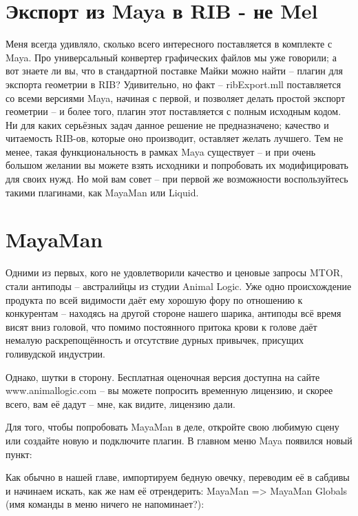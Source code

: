 \section*{Экспорт из Maya в RIB - не Mel}
  

 Меня всегда удивляло, сколько всего интересного
    поставляется в комплекте с Maya. Про универсальный конвертер
    графических файлов мы уже говорили; а вот знаете ли вы, что в
    стандартной поставке Майки можно найти – плагин для экспорта
    геометрии в RIB? Удивительно, но факт – ribExport.mll поставляется
    со всеми версиями Maya, начиная с первой, и позволяет делать
    простой экспорт геометрии – и более того, плагин этот поставляется
    с полным исходным кодом. Ни для каких серьёзных задач данное
    решение не предназначено; качество и читаемость RIB-ов, которые оно
    производит, оставляет желать лучшего. Тем не менее, такая
    функциональность в рамках Maya существует – и при очень большом
    желании вы можете взять исходники и попробовать их модифицировать
    для своих нужд. Но мой вам совет – при первой же возможности
    воспользуйтесь такими плагинами, как MayaMan или Liquid.
  
\section*{MayaMan}
  

 Одними из первых, кого не удовлетворили качество и
    ценовые запросы MTOR, стали антиподы – австралийцы из студии Animal
    Logic. Уже одно происхождение продукта по всей видимости даёт ему
    хорошую фору по отношению к конкурентам – находясь на другой
    стороне нашего шарика, антиподы всё время висят вниз головой, что
    помимо постоянного притока крови к голове даёт немалую
    раскрепощённость и отсутствие дурных привычек, присущих голивудской
    индустрии.
  

 Однако, шутки в сторону. Бесплатная оценочная
    версия доступна на сайте www.animallogic.com – вы можете
    попросить временную лицензию, и скорее всего, вам её дадут – мне,
    как видите, лицензию дали.
  

 Для того, чтобы попробовать MayaMan в деле,
    откройте свою любимую сцену или создайте новую и подключите плагин.
    В главном меню Maya появился новый пункт:
  

  

 Как обычно в нашей главе, импортируем бедную
    овечку, переводим её в сабдивы и начинаем искать, как же нам её
    отрендерить: MayaMan => MayaMan Globals (имя команды в меню
    ничего не напоминает?):
  

